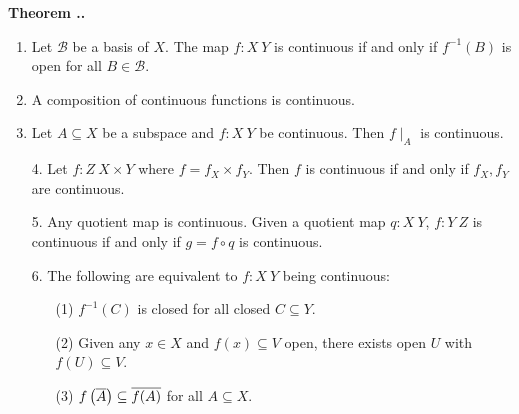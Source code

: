 \documentclass{natsirt}
\newcommand{\scr}{\mathscr}
\newcommand{\ol}{\overline}
\newcounter{thm}[section]
\newenvironment{thmbox}[1][]{
\begin{greenbox}[#1]\refstepcounter{thm}\textbf{Theorem \thesection.\thethm. }}{\end{greenbox}}
\begin{document}
\begin{thmbox}
    \begin{enumerate}
        \item Let $\scr{B}$ be a basis of $X$. The map $f:X\>Y$ is continuous if and only if $f^{-1}(B)$ is open for all $B\in \scr{B}$.
        \item A composition of continuous functions is continuous.
        \item Let $A\subseteq X$ be a subspace and $f:X\>Y$ be continuous. Then $f\mid_A$ is continuous.
        \item[4.] Let $f:Z\> X\times Y$ where $f = f_X\times f_Y$. Then $f$ is continuous if and only if $f_X,f_Y$ are continuous.
        \item[5.] Any quotient map is continuous. Given a quotient map $q:X\> Y$, $f:Y\> Z$ is continuous if and only if $g = f\circ q$ is continuous.\vspace{-0.2cm}
        \begin{center}
        \end{center}\vspace{-0.7cm}
        \item[6.] The following are equivalent to $f:X\>Y$ being continuous:
        \begin{itemize}
            \item[(1)] $f^{-1}(C)$ is closed for all closed $C\subseteq Y$.
            \item[(2)] Given any $x\in X$ and $f(x) \subseteq V$ open, there exists open $U$ with $f(U)\subseteq V$.
            \item[(3)] $f\pr{\ol{A}} \subseteq \ol{f(A)}$ for all $A\subseteq X$.
        \end{itemize}
    \end{enumerate}
\end{thmbox}
\end{document}
